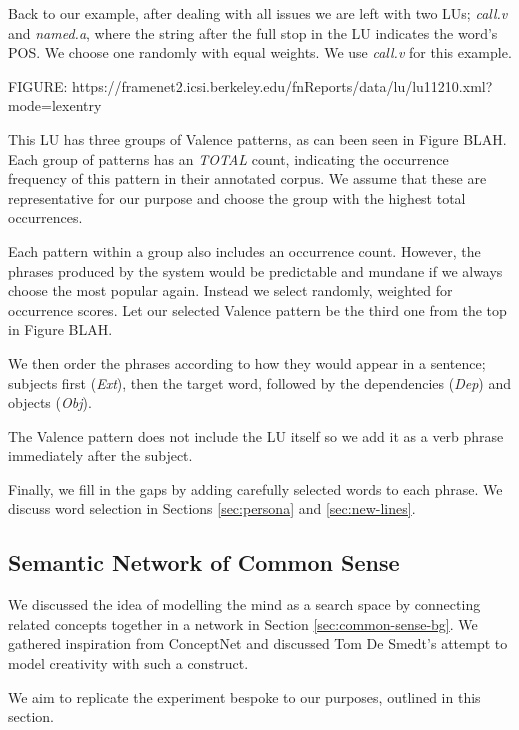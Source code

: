 Back to our example, after dealing with all issues we are left with two LUs; \textit{call.v} and \textit{named.a}, where the string after the full stop in the LU indicates the word's POS. We choose one randomly with equal weights. We use \textit{call.v} for this example.

FIGURE: https://framenet2.icsi.berkeley.edu/fnReports/data/lu/lu11210.xml?mode=lexentry

This LU has three groups of Valence patterns, as can been seen in Figure BLAH. Each group of patterns has an \textit{TOTAL} count, indicating the occurrence frequency of this pattern in their annotated corpus. We assume that these are representative for our purpose and choose the group with the highest total occurrences.

Each pattern within a group also includes an occurrence count. However, the phrases produced by the system would be predictable and mundane if we always choose the most popular again. Instead we select randomly, weighted for occurrence scores. Let our selected Valence pattern be the third one from the top in Figure BLAH.

We then order the phrases according to how they would appear in a sentence; subjects first (\textit{Ext}), then the target word, followed by the dependencies (\textit{Dep}) and objects (\textit{Obj}).

The Valence pattern does not include the LU itself so we add it as a verb phrase immediately after the subject.

Finally, we fill in the gaps by adding carefully selected words to each phrase. We discuss word selection in Sections  \ref{sec:persona} and \ref{sec:new-lines}.

\subsection{Semantic Network of Common Sense}
\label{sec:common-sense}
We discussed the idea of modelling the mind as a search space by connecting related concepts together in a network in Section \ref{sec:common-sense-bg}. We gathered inspiration from ConceptNet and discussed Tom De Smedt's attempt to model creativity with such a construct.
 
We aim to replicate the experiment bespoke to our purposes, outlined in this section.
 
